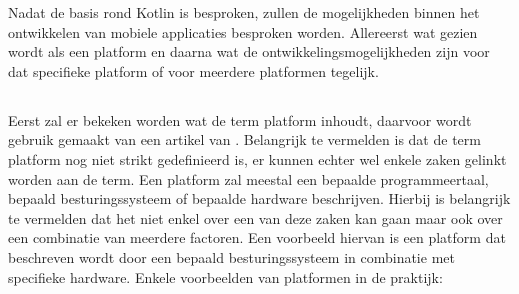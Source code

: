 Nadat de basis rond Kotlin is besproken, zullen de mogelijkheden binnen het ontwikkelen van mobiele applicaties besproken worden. Allereerst wat gezien wordt als een platform en daarna wat de ontwikkelingsmogelijkheden zijn voor dat specifieke platform of voor meerdere platformen tegelijk.

\subsection{}
\label{sec:SVZplatform}

Eerst zal er bekeken worden wat de term platform inhoudt, daarvoor wordt gebruik gemaakt van een artikel van \textcite{Bishop2006}. Belangrijk te vermelden is dat de term platform nog niet strikt gedefinieerd is, er kunnen echter wel enkele zaken gelinkt worden aan de term. Een platform zal meestal een bepaalde programmeertaal, bepaald besturingssysteem of bepaalde hardware beschrijven. Hierbij is belangrijk te vermelden dat het niet enkel over een van deze zaken kan gaan maar ook over een combinatie van meerdere factoren. Een voorbeeld hiervan is een platform dat beschreven wordt door een bepaald besturingssysteem in combinatie met specifieke hardware. Enkele voorbeelden van platformen in de praktijk:
